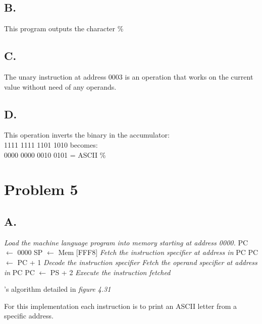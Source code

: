 \documentclass[a4paper,man,natbib]{apa6}
\begin{document}
\subsection{B.}
This program outputs the character \%
\subsection{C.}
The unary instruction at address 0003 is an operation that works on the current value without need of any operands.
\subsection{D.}
This operation inverts the binary in the accumulator: \\
1111 1111 1101 1010 becomes: \\
0000 0000 0010 0101 = ASCII \%
\section{Problem 5}
\subsection{A.}
\begin{algorithm}[H]
	\begin{algorithmic}
		\State\emph{Load the machine language program into memory starting at address 0000.}
		\State PC $\gets$ 0000
		\State SP $\gets$ Mem [FFF8]
		\Do
			\State\emph{Fetch the instruction specifier at address in} PC
			\State PC $\gets$ PC + 1
			\State\emph{Decode the instruction specifier}
				\State\emph{Fetch the operand specifier at address in} PC
				\State PC $\gets$ PS + 2
			\EndIf
			\State\emph{Execute the instruction fetched}
	\end{algorithmic}
	\caption{\cite{warford10}'s algorithm detailed in \emph{figure 4.31}}
\end{algorithm}
For this implementation each instruction is to print an ASCII letter from a specific address.
\end{document}
